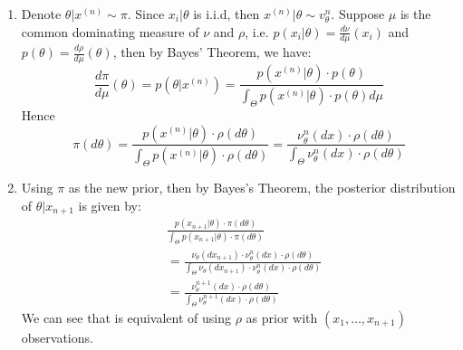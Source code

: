 \documentclass{article}
\begin{document}



\begin{enumerate}
\item 
Denote $\theta | x^{(n)} \sim \pi$. Since $x_i|\theta$ is i.i.d, then $x^{(n)} |\theta \sim v_{\theta}^n$. Suppose $\mu$ is the common dominating measure of $\nu$ and $\rho$, i.e. $p(x_i|\theta) = \frac{d\nu}{d\mu}(x_i)$ and $p(\theta) = \frac{d\rho}{d\mu}(\theta)$, then by Bayes' Theorem, we have:
\[\frac{d\pi}{d\mu}(\theta) = p(\theta | x^{(n)}) = \frac{p(x^{(n)}|\theta) \cdot p(\theta)}{\int_{\Theta} p(x^{(n)}|\theta) \cdot p(\theta) d\mu}\]
Hence\[\pi(d\theta) = \frac{p(x^{(n)}|\theta) \cdot \rho(d\theta)}{\int_{\Theta} p(x^{(n)}|\theta) \cdot \rho(d\theta)} = \frac{\nu_{\theta}^n(dx)\cdot \rho(d\theta)}{\int_{\Theta} \nu_{\theta}^n(dx) \cdot \rho(d\theta)}\]



\item 
Using $\pi$ as the new prior, then by Bayes's Theorem, the posterior distribution of $\theta|x_{n+1}$ is given by:
\begin{align*}
& \frac{p(x_{n+1}|\theta) \cdot \pi(d\theta)}{\int_{\Theta} p(x_{n+1}|\theta) \cdot \pi(d\theta)}\\
& = \frac{\nu_{\theta}(dx_{n+1}) \cdot \nu_{\theta}^n(dx)\cdot \rho(d\theta)}{\int_{\Theta} \nu_{\theta}(dx_{n+1}) \cdot \nu_{\theta}^n(dx)\cdot \rho(d\theta)}\\
& = \frac{\nu_{\theta}^{n+1}(dx) \cdot \rho(d\theta)}{\int_{\Theta} \nu_{\theta}^{n+1}(dx)\cdot \rho(d\theta)}
\end{align*}We can see that is equivalent of using $\rho$ as prior with $(x_1, \ldots, x_{n+1})$ observations.






\end{enumerate}
\end{document}
